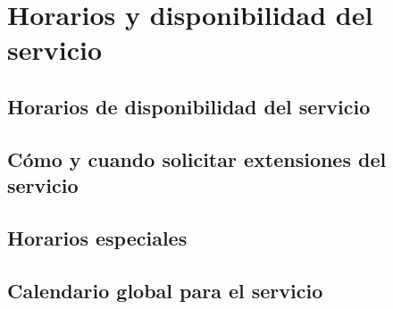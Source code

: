 \section{Horarios y disponibilidad del servicio}

\subsection{Horarios de disponibilidad del servicio}

\subsection{C\'omo y cuando solicitar extensiones del servicio}

\subsection{Horarios especiales}

\subsection{Calendario global para el servicio}


